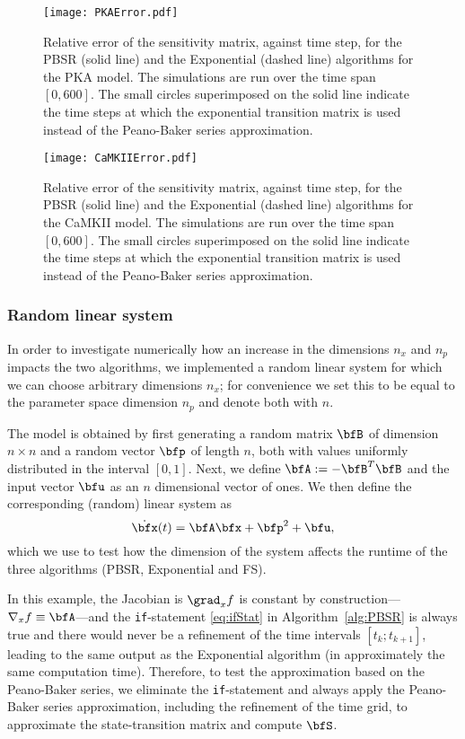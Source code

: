 \documentclass[DIV=12]{scrartcl} %
\theoremstyle{definition}
\begin{document}
\begin{figure}
    \centering
    \texttt{[image: PKAError.pdf]}
    \caption{Relative error of the sensitivity matrix, against time step, for the PBSR (solid line) and the Exponential (dashed line) algorithms for the PKA model. The simulations are run over the time span $[0,600]$. The small circles superimposed on the solid line indicate the time steps at which the exponential transition matrix is used instead of the Peano-Baker series approximation.}
    \label{fig:PKA}
\end{figure}

\begin{figure}
    \centering
    \texttt{[image: CaMKIIError.pdf]}
    \caption{Relative error of the sensitivity matrix, against time step, for the PBSR (solid line) and the Exponential (dashed line) algorithms for the CaMKII model. The simulations are run over the time span $[0,600]$. The small circles superimposed on the solid line indicate the time steps at which the exponential transition matrix is used instead of the Peano-Baker series approximation.}
    \label{fig:CaMKII}
\end{figure}

\subsubsection*{Random linear system}
In order to investigate numerically how an increase in the dimensions $n_x$ and $n_p$ impacts the two algorithms, we implemented a random linear system for which we can choose arbitrary dimensions $n_x$; for convenience  we set this to be equal to the parameter space dimension $n_p$ and denote both with $n$. 

The model is obtained by first generating a random matrix $\bfB$ of dimension $n \times n$ and a random vector $\bfp$ of length $n$, both with values uniformly distributed in the interval $[0,1]$. Next, we define $\bfA:=-\bfB^T\bfB$ and the input vector $\bfu$ as an $n$ dimensional vector of ones. We then define the corresponding (random) linear system as
\[\dot{\bfx}(t)=\bfA\bfx+\bfp^2+\bfu,\]
which we use to test how the dimension of the system affects the runtime of the three algorithms (PBSR, Exponential and FS).

In this example, the Jacobian is $\grad _x f$ is constant by construction—$\nabla _x f \equiv \bfA$—and the \texttt{if}-statement \eqref{eq:ifStat} in Algorithm~\ref{alg:PBSR} is always true and there would never be a refinement of the time intervals $[t_k;t_{k+1}]$, leading to the same output as the Exponential algorithm (in approximately the same computation time). Therefore, to test the approximation based on the Peano-Baker series, we eliminate the \texttt{if}-statement and always apply the Peano-Baker series approximation, including the refinement of the time grid, to approximate the state-transition matrix and compute $\bfS$.
\end{document}
